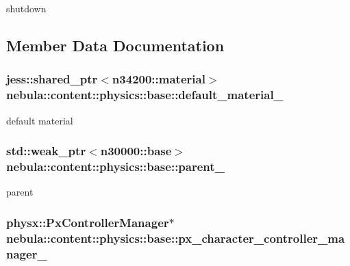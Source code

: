 shutdown 

\subsection{Member Data Documentation}
\hypertarget{classnebula_1_1content_1_1physics_1_1base_a648b28fd4c586b69c2f09ff51e539d5a}{
\subsubsection[{default\_\-material\_\-}]{\setlength{\rightskip}{0pt plus 5cm}jess::shared\_\-ptr$<${\bf n34200::material}$>$ {\bf nebula::content::physics::base::default\_\-material\_\-}}}
\label{classnebula_1_1content_1_1physics_1_1base_a648b28fd4c586b69c2f09ff51e539d5a}


default material \hypertarget{classnebula_1_1content_1_1physics_1_1base_a4b1990c57e38170ea69cbe7ae5ca8b70}{
\subsubsection[{parent\_\-}]{\setlength{\rightskip}{0pt plus 5cm}std::weak\_\-ptr$<${\bf n30000::base}$>$ {\bf nebula::content::physics::base::parent\_\-}}}
\label{classnebula_1_1content_1_1physics_1_1base_a4b1990c57e38170ea69cbe7ae5ca8b70}


parent \hypertarget{classnebula_1_1content_1_1physics_1_1base_a05e856150d8220d4b8d1f6db1041bf59}{
\subsubsection[{px\_\-character\_\-controller\_\-manager\_\-}]{\setlength{\rightskip}{0pt plus 5cm}physx::PxControllerManager$\ast$ {\bf nebula::content::physics::base::px\_\-character\_\-controller\_\-manager\_\-}}}
\label{classnebula_1_1content_1_1physics_1_1base_a05e856150d8220d4b8d1f6db1041bf59}


